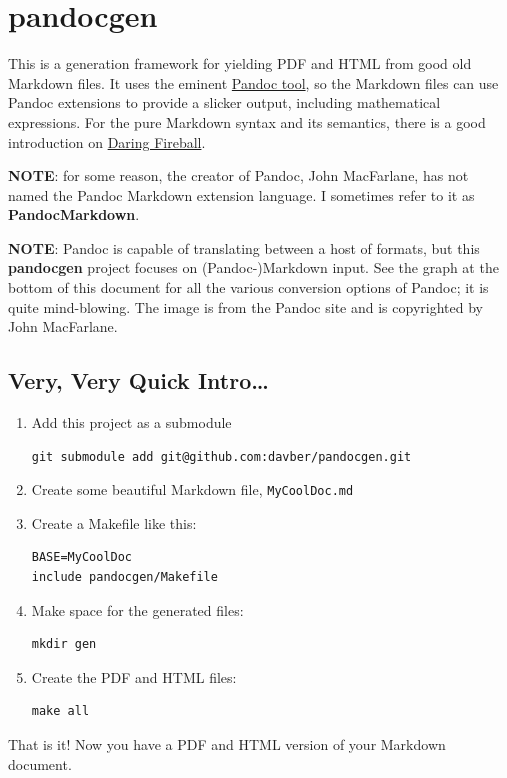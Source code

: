 \documentclass[oneside,]{memoir}
\begin{document}
\chapter{pandocgen}

This is a generation framework for yielding PDF and HTML from good old
Markdown files. It uses the eminent
\href{http://johnmacfarlane.net/pandoc/}{Pandoc tool}, so the Markdown
files can use Pandoc extensions to provide a slicker output, including
mathematical expressions. For the pure Markdown syntax and its
semantics, there is a good introduction on
\href{http://daringfireball.net/projects/markdown/syntax/}{Daring
Fireball}.

\textbf{NOTE}: for some reason, the creator of Pandoc, John MacFarlane,
has not named the Pandoc Markdown extension language. I sometimes refer
to it as \textbf{PandocMarkdown}.

\textbf{NOTE}: Pandoc is capable of translating between a host of
formats, but this \textbf{pandocgen} project focuses on
(Pandoc-)Markdown input. See the graph at the bottom of this document
for all the various conversion options of Pandoc; it is quite
mind-blowing. The image is from the Pandoc site and is copyrighted by
John MacFarlane.

\section{Very, Very Quick Intro\ldots{}}

\begin{enumerate}[1.]
\item
  Add this project as a submodule

\begin{verbatim}
git submodule add git@github.com:davber/pandocgen.git
\end{verbatim}
\item
  Create some beautiful Markdown file, \texttt{MyCoolDoc.md}
\item
  Create a Makefile like this:

\begin{verbatim}
BASE=MyCoolDoc
include pandocgen/Makefile
\end{verbatim}
\item
  Make space for the generated files:

\begin{verbatim}
mkdir gen
\end{verbatim}
\item
  Create the PDF and HTML files:

\begin{verbatim}
make all
\end{verbatim}
\end{enumerate}
That is it! Now you have a PDF and HTML version of your Markdown
document.
\end{document}

